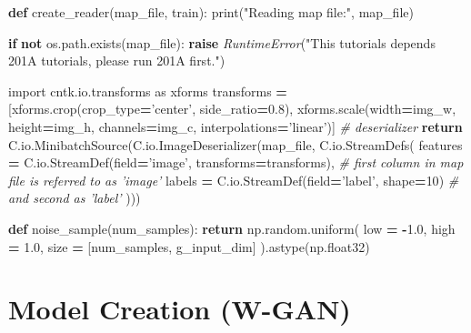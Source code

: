 \documentclass[]{book}
\newenvironment{Shaded}{\begin{snugshade}}{\end{snugshade}}
\newcommand{\KeywordTok}[1]{\textcolor[rgb]{0.13,0.29,0.53}{\textbf{#1}}}
\newcommand{\DecValTok}[1]{\textcolor[rgb]{0.00,0.00,0.81}{#1}}
\newcommand{\FloatTok}[1]{\textcolor[rgb]{0.00,0.00,0.81}{#1}}
\newcommand{\StringTok}[1]{\textcolor[rgb]{0.31,0.60,0.02}{#1}}
\newcommand{\ImportTok}[1]{#1}
\newcommand{\CommentTok}[1]{\textcolor[rgb]{0.56,0.35,0.01}{\textit{#1}}}
\newcommand{\ControlFlowTok}[1]{\textcolor[rgb]{0.13,0.29,0.53}{\textbf{#1}}}
\newcommand{\OperatorTok}[1]{\textcolor[rgb]{0.81,0.36,0.00}{\textbf{#1}}}
\newcommand{\BuiltInTok}[1]{#1}
\newcommand{\PreprocessorTok}[1]{\textcolor[rgb]{0.56,0.35,0.01}{\textit{#1}}}
\newcommand{\NormalTok}[1]{#1}
\theoremstyle{definition}
\theoremstyle{definition}
\theoremstyle{definition}
\theoremstyle{remark}
\begin{document}
\begin{Shaded}
\begin{Highlighting}[]
\KeywordTok{def}\NormalTok{ create_reader(map_file, train):}
    \BuiltInTok{print}\NormalTok{(}\StringTok{"Reading map file:"}\NormalTok{, map_file)}
    
    \ControlFlowTok{if} \KeywordTok{not}\NormalTok{ os.path.exists(map_file):}
        \ControlFlowTok{raise} \PreprocessorTok{RuntimeError}\NormalTok{(}\StringTok{"This tutorials depends 201A tutorials, please run 201A first."}\NormalTok{)}
    
    \ImportTok{import}\NormalTok{ cntk.io.transforms }\ImportTok{as}\NormalTok{ xforms}
\NormalTok{    transforms }\OperatorTok{=}\NormalTok{ [xforms.crop(crop_type}\OperatorTok{=}\StringTok{'center'}\NormalTok{, side_ratio}\OperatorTok{=}\FloatTok{0.8}\NormalTok{),}
\NormalTok{                  xforms.scale(width}\OperatorTok{=}\NormalTok{img_w, height}\OperatorTok{=}\NormalTok{img_h, channels}\OperatorTok{=}\NormalTok{img_c, interpolations}\OperatorTok{=}\StringTok{'linear'}\NormalTok{)]}
    \CommentTok{# deserializer}
    \ControlFlowTok{return}\NormalTok{ C.io.MinibatchSource(C.io.ImageDeserializer(map_file, C.io.StreamDefs(}
\NormalTok{        features }\OperatorTok{=}\NormalTok{ C.io.StreamDef(field}\OperatorTok{=}\StringTok{'image'}\NormalTok{, transforms}\OperatorTok{=}\NormalTok{transforms), }\CommentTok{# first column in map file is referred to as 'image'}
\NormalTok{        labels   }\OperatorTok{=}\NormalTok{ C.io.StreamDef(field}\OperatorTok{=}\StringTok{'label'}\NormalTok{, shape}\OperatorTok{=}\DecValTok{10}\NormalTok{)      }\CommentTok{# and second as 'label'}
\NormalTok{    )))}
\end{Highlighting}
\end{Shaded}

\begin{Shaded}
\begin{Highlighting}[]
\KeywordTok{def}\NormalTok{ noise_sample(num_samples):}
    \ControlFlowTok{return}\NormalTok{ np.random.uniform(}
\NormalTok{        low }\OperatorTok{=} \OperatorTok{-}\FloatTok{1.0}\NormalTok{,}
\NormalTok{        high }\OperatorTok{=} \FloatTok{1.0}\NormalTok{,}
\NormalTok{        size }\OperatorTok{=}\NormalTok{ [num_samples, g_input_dim]}
\NormalTok{    ).astype(np.float32)}
\end{Highlighting}
\end{Shaded}

\section{Model Creation (W-GAN)}\label{model-creation-w-gan}
\end{document}
